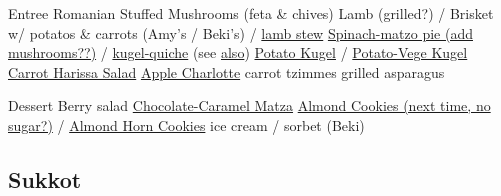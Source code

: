 Entree
Romanian Stuffed Mushrooms (feta \& chives)
Lamb (grilled?) / Brisket w/ potatos \& carrots (Amy's / Beki's) / \href{https://instantpoteats.com/instant-pot-leg-lamb-stew-dates-cinnamon/}{lamb stew}
\href{https://www.epicurious.com/recipes/food/views/spinach-and-matzoh-pie-242019}{Spinach-matzo pie (add mushrooms??)} / \href{https://www.myjewishlearning.com/the-nosher/quiche-with-veggie-crust-recipe/}{kugel-quiche} (see \href{https://toriavey.com/toris-kitchen/potato-crusted-spinach-frittata/}{also})
\href{https://smittenkitchen.com/2015/12/potato-kugel/}{Potato Kugel} / \href{https://www.epicurious.com/recipes/food/views/potato-carrot-and-zucchini-kugel-241904}{Potato-Vege Kugel}
\href{https://smittenkitchen.com/2010/05/carrot-salad-with-harissa-feta-and-mint/}{Carrot Harissa Salad}
\hyperref[Apple Matzo Charlotte]{Apple Charlotte}
carrot tzimmes
grilled asparagus

Dessert
Berry salad
\href{https://smittenkitchen.com/2009/04/chocolate-caramel-crackers/}{Chocolate-Caramel Matza}
\href{https://smittenkitchen.com/2009/04/chewy-amaretti-cookies/}{Almond Cookies (next time, no sugar?)} / \href{https://smittenkitchen.com/2017/04/almond-horn-cookies/}{Almond Horn Cookies}
ice cream / sorbet (Beki)

\subsection{Sukkot}
